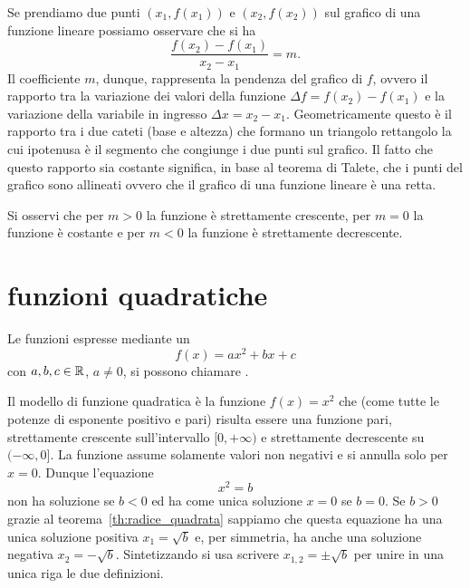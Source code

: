 Se prendiamo due punti $(x_1,f(x_1))$
e $(x_2,f(x_2))$ sul grafico di una funzione lineare
possiamo osservare che si ha
\[
  \frac{f(x_2) - f(x_1)}{x_2 - x_1} = m.
\]
Il coefficiente $m$, dunque, rappresenta la pendenza del
grafico di $f$, ovvero il rapporto tra la variazione
dei valori della funzione $\Delta f = f(x_2) - f(x_1)$
e la variazione della variabile in ingresso
$\Delta x = x_2 - x_1$.
Geometricamente questo è il rapporto tra i due cateti
(base e altezza) che formano un triangolo rettangolo la
cui ipotenusa è il segmento che congiunge i due punti sul grafico.
Il fatto che questo rapporto sia costante significa,
in base al teorema di Talete, che i punti del grafico sono
allineati ovvero che il grafico di una funzione lineare è una retta.

Si osservi che per $m>0$ la funzione è strettamente crescente,
per $m=0$ la funzione è costante e per $m<0$ la funzione è
strettamente decrescente.

\section{funzioni quadratiche}

Le funzioni espresse mediante un 
\begin{equation}\label{eq:funzione_quadratica}
  f(x) = ax^2 + bx +c
\end{equation}
con $a,b,c\in \mathbb R$, $a\neq 0$, si possono chiamare
.

Il modello di funzione quadratica è la funzione
$f(x) = x^2$ che (come tutte le potenze di esponente positivo e pari)
risulta essere una funzione pari, strettamente crescente
sull'intervallo $[0,+\infty)$ e strettamente decrescente
su $(-\infty,0]$. La funzione assume solamente valori non negativi
e si annulla solo per $x=0$.
Dunque l'equazione
\[
  x^2 = b
\]
non ha soluzione se $b<0$ ed ha come unica soluzione $x=0$ se $b=0$.
Se $b>0$ grazie al teorema~\ref{th:radice_quadrata} sappiamo che
questa equazione ha una unica soluzione positiva $x_1 = \sqrt{b}$
e, per simmetria, ha anche una soluzione negativa $x_2 = -\sqrt{b}$.
Sintetizzando si usa scrivere $x_{1,2} = \pm \sqrt{b}$
per unire in una unica riga le due definizioni.

